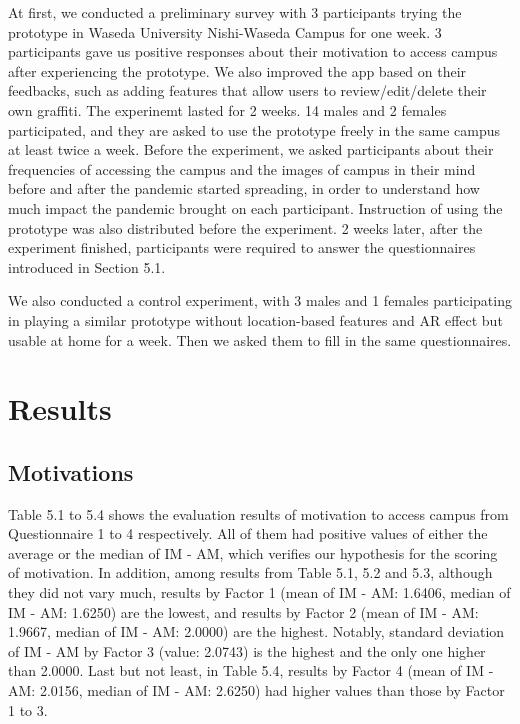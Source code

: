 At first, we conducted a preliminary survey with 3 participants trying the prototype in Waseda University Nishi-Waseda Campus for one week.
3 participants gave us positive responses about their motivation to access campus after experiencing the prototype.
We also improved the app based on their feedbacks, such as adding features that allow users to review/edit/delete their own graffiti.
The experinemt lasted for 2 weeks. 14 males and 2 females participated,
and they are asked to use the prototype freely in the same campus at least twice a week.
Before the experiment, we asked participants about their frequencies of accessing the campus and the images of campus in their mind before and after the pandemic started spreading,
in order to understand how much impact the pandemic brought on each participant.
Instruction of using the prototype was also distributed before the experiment.
2 weeks later, after the experiment finished, participants were required to answer the questionnaires introduced in Section 5.1.

We also conducted a control experiment, with 3 males and 1 females participating in playing a similar prototype without location-based features and AR effect but usable at home for a week.
Then we asked them to fill in the same questionnaires.

\section{Results}
\subsection{Motivations}

Table 5.1 to 5.4 shows the evaluation results of motivation to access campus from Questionnaire 1 to 4 respectively.
All of them had positive values of either the average or the median of IM - AM, which verifies our hypothesis for the scoring of motivation.
In addition, among results from Table 5.1, 5.2 and 5.3, although they did not vary much, results by Factor 1 (mean of IM - AM: 1.6406, median of IM - AM: 1.6250) are the lowest,
and results by Factor 2 (mean of IM - AM: 1.9667, median of IM - AM: 2.0000) are the highest.
Notably, standard deviation of IM - AM by Factor 3 (value: 2.0743) is the highest and the only one higher than 2.0000.
Last but not least, in Table 5.4, results by Factor 4 (mean of IM - AM: 2.0156, median of IM - AM: 2.6250) had higher values than those by Factor 1 to 3.

